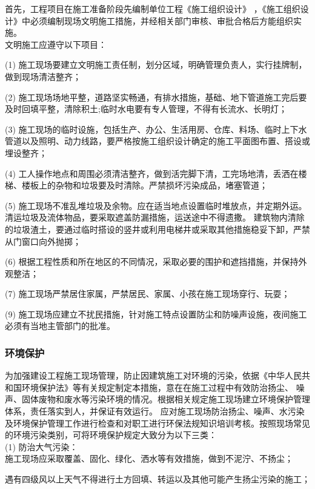 首先，工程项目在施工准备阶段先编制单位工程《施工组织设计》
，《施工组织设计》中必须编制现场文明施工措施，并经相关部门审核、审批合格后方能组织实施。\\

文明施工应遵守以下项目：

(1) 施工现场要建立文明施工责任制，划分区域，明确管理负责人，实行挂牌制，做到现场清洁整齐；

(2) 施工现场场地平整，道路坚实畅通，有排水措施，基础、地下管道施工完后要及时回填平整，清除积土;临时水电要有专人管理，不得有长流水、长明灯；

(3) 施工现场的临时设施，包括生产、办公、生活用房、仓库、料场、临时上下水管道以及照明、动力线路，要严格按施工组织设计确定的施工平面图布置、搭设或埋设整齐；

(4) 工人操作地点和周围必须清洁整齐，做到活完脚下清，工完场地清，丢洒在楼梯、楼板上的杂物和垃圾要及时清除。严禁损坏污染成品，堵塞管道；

(5) 施工现场不准乱堆垃圾及余物。应在适当地点设置临时堆放点，并定期外运。清运垃圾及流体物品，要采取遮盖防漏措施，运送途中不得遗撒。
建筑物内清除的垃圾渣土，要通过临时搭设的竖井或利用电梯井或采取其他措施稳妥下卸，严禁从门窗口向外抛掷；

(6) 根据工程性质和所在地区的不同情况，采取必要的围护和遮挡措施，并保持外观整洁；

(7) 施工现场严禁居住家属，严禁居民、家属、小孩在施工现场穿行、玩耍；

(9) 施工现场应建立不扰民措施，针对施工特点设置防尘和防噪声设施，夜间施工必须有当地主管部门的批准。

\subsubsection{环境保护}

为加强建设工程施工现场管理，防止因建筑施工对环境的污染，依据《中华人民共和国环境保护法》等有关规定制定本措施，意在在施工过程中有效防治扬尘、
噪声、固体废物和废水等污染环境的情况。根据相关规定施工现场建立环境保护管理体系，责任落实到人，并保证有效运行。
应对施工现场防治扬尘、噪声、水污染及环境保护管理工作进行检查和对职工进行环保法规知识培训考核。按照现场常见的环境污染类别，可将环境保护规定大致分为以下三类：\\

(1) 防治大气污染：\\

 施工现场应采取覆盖、固化、绿化、洒水等有效措施，做到不泥泞、不扬尘；

 遇有四级风以上天气不得进行土方回填、转运以及其他可能产生扬尘污染的施工；

